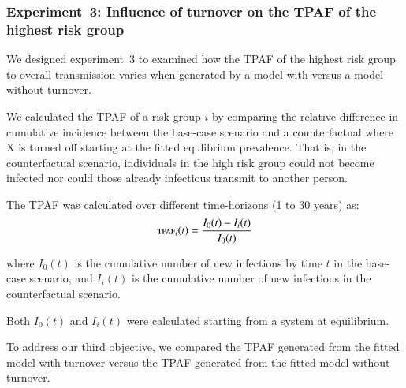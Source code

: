 \subsubsection{Experiment~3: Influence of turnover on the TPAF of the highest risk group}
\label{sss:exp-tpaf}
We designed experiment~3 to examined how the TPAF of the 
highest risk group to overall transmission varies when generated
by a model with versus a model without turnover.

We calculated the TPAF of a risk group $i$ by comparing the relative difference in 
cumulative incidence between the base-case scenario and a 
counterfactual where X is turned off starting at the fitted equlibrium prevalence. 	%
That is, in the counterfactual scenario, individuals in the high risk group could not become 
infected nor could those already infectious transmit to another person.		%

The TPAF was calculated over different time-horizons (1 to 30 years) as:		%
\begin{equation}
\textsc{tpaf}_i(t) = \frac{I_0(t) - I_i(t)}{I_0(t)}
\end{equation}

where $I_0(t)$ is the cumulative number of new infections
by time $t$ in the base-case scenario,
and $I_i(t)$ is the cumulative number of new infections in the counterfactual scenario.

Both $I_0(t)$ and $I_i(t)$ were calculated					%
starting from a system at equilibrium.
\par
To address our third objective, we compared the TPAF generated from
the fitted model with turnover versus the TPAF generated from the 
fitted model without turnover.